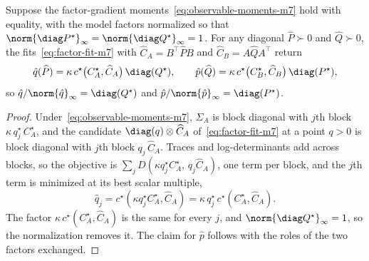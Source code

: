 \begin{lemma}\label{lem:consistency-m7}
Suppose the factor-gradient moments~\eqref{eq:observable-moments-m7} hold with
equality, with the model factors normalized so that
$\norm{\diag P^\star}_\infty=\norm{\diag Q^\star}_\infty=1$. For any diagonal
$\widehat P\succ0$ and $\widehat Q\succ0$, the
fits~\eqref{eq:factor-fit-m7} with $\widehat C_A=B^\top\widehat PB$ and
$\widehat C_B=A\widehat QA^\top$ return
\[
  \hat{q}(\widehat P)=\kappa\,c^\star\big(C^\star_A,\widehat C_A\big)\,\diag(Q^\star),
  \qquad
  \hat{p}(\widehat Q)=\kappa\,c^\star\big(C^\star_B,\widehat C_B\big)\,\diag(P^\star),
\]
so $\hat{q}/\norm{\hat{q}}_\infty=\diag(Q^\star)$ and
$\hat{p}/\norm{\hat{p}}_\infty=\diag(P^\star)$.
\end{lemma}
\begin{proof}
Under~\eqref{eq:observable-moments-m7}, $\Sigma_A$ is
block diagonal with $j$th block $\kappa\,q^\star_j\,C^\star_A$, and the
candidate $\diag(q)\otimes\widehat C_A$ of~\eqref{eq:factor-fit-m7} at a
point $q>0$ is block diagonal with $j$th block $q_j\,\widehat C_A$. Traces
and log-determinants add across blocks, so the objective is
$\sum_jD(\kappa q^\star_jC^\star_A,\,q_j\widehat C_A)$, one term per block,
and the $j$th term is minimized at its best scalar multiple,
\[
\hat{q}_j=c^\star(\kappa q^\star_jC^\star_A,\widehat C_A)
=\kappa\,q^\star_j\,c^\star(C^\star_A,\widehat C_A).
\]
The factor $\kappa\,c^\star(C^\star_A,\widehat C_A)$ is the same for every
$j$, and $\norm{\diag Q^\star}_\infty=1$, so the normalization removes it.
The claim for $\hat{p}$ follows with the roles of the two factors exchanged.
\end{proof}

